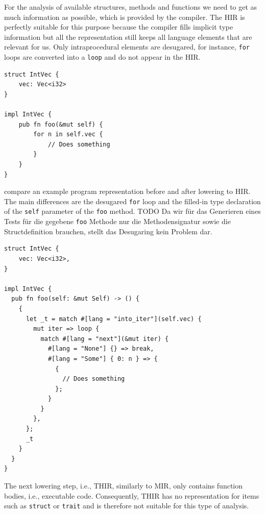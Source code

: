 \documentclass[paper=a4,%
  twoside,%
  BCOR4mm,%
  abstract=true,%
  toc=bibliography,%
  chapterprefix=true,%
  toc=bibliographynumbered,%
  open=right,%
  english,%
  pagesize=pdftex]{scrreprt}
\newcommand{\hir}{\ac{HIR}\xspace}
\newcommand{\mir}{\ac{MIR}\xspace}
\begin{document}
For the analysis of available structures, methods and functions we need to get as much information as possible, which is provided by the compiler. The \hir is perfectly suitable for this purpose because the compiler fills implicit type information but all the representation still keeps all language elements that are relevant for us. Only intraprocedural elements are desugared, for instance, \texttt{for} loops are converted into a \texttt{loop} and do not appear in the \hir.
\begin{lstlisting}[style=boxed, caption={An example Rust program that we convert to HIR}, label=lst:hir-lowering]
struct IntVec {
    vec: Vec<i32>
}

impl IntVec {
    pub fn foo(&mut self) {
        for n in self.vec {
            // Does something
        }
    }
}
\end{lstlisting}

 compare an example program representation before and after lowering to \hir. The main differences are the desugared \texttt{for} loop and the filled-in type declaration of the \texttt{self} parameter of the \texttt{foo} method. TODO Da wir für das Generieren eines Tests für die gegebene \texttt{foo} Methode nur die Methodensignatur sowie die Structdefinition brauchen, stellt das Desugaring kein Problem dar.

\begin{lstlisting}[style=boxed, caption={HIR of the code in \Cref{lst:hir-lowering}}, label=lst:hir-lowered]
struct IntVec {
    vec: Vec<i32>,
}

impl IntVec {
  pub fn foo(self: &mut Self) -> () {
    {
      let _t = match #[lang = "into_iter"](self.vec) {
        mut iter => loop {
          match #[lang = "next"](&mut iter) {
            #[lang = "None"] {} => break,
            #[lang = "Some"] { 0: n } => {
              {
                // Does something
              };
            }
          }
        },
      };
      _t
    }
  }
}
\end{lstlisting}

The next lowering step, i.e., \ac{THIR}, similarly to \mir, only contains function bodies, i.e., executable code. Consequently, \ac{THIR} has no representation for items such as \texttt{struct} or \texttt{trait} and is therefore not suitable for this type of analysis.
\end{document}
